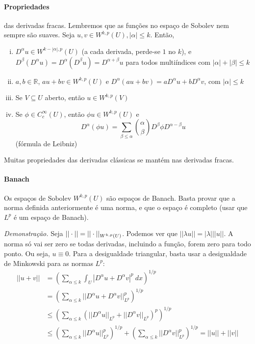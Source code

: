 \documentclass[11pt]{article}
\newcommand{\R}{\mathbb{R}}
\begin{document}
\paragraph{Propriedades} das derivadas fracas. Lembremos que as funções no espaço de Sobolev nem sempre são suaves. Seja \( u,v \in W^{k,p}(U), |\alpha| \leq k \). Então, \begin{enumerate}[(i)]
	\item \( D^\alpha u \in W^{k-|\alpha|, p}(U) \) (a cada derivada, perde-se \( 1 \) no \( k \)), e\\ \( D^\beta(D^\alpha u)=D^\alpha(D^\beta u) = D^{\alpha + \beta}u \) para todos multiíndices com \( |\alpha|+ |\beta| \leq k \)
	\item \(a, b \in \R \), \( au + bv \in W^{k,p}(U) \) e \( D^\alpha(au +bv) = aD^\alpha u + bD^\alpha v \), com \( |\alpha|\leq k \)
	\item Se \( V \subseteq U \) aberto, então \( u \in W^{k,p}(V) \)
	\item Se \( \phi \in C^\infty_c(U) \), então \( \phi u \in W^{k,p}(U) \) e \[ D^\alpha(\phi u) = \sum_{\beta \leq \alpha} \binom{\alpha}{\beta} D^\beta \phi D^{\alpha - \beta}u \] (fórmula de Leibniz)
\end{enumerate}

Muitas propriedades das derivadas clássicas se mantém nas derivadas fracas.

\paragraph{Banach} Os espaços de Sobolev \( W^{k,p}(U) \) são espaços de Banach. Basta provar que a norma definida anteriormente é uma norma, e que o espaço é completo (usar que \( L^p \) é um espaço de Banach).

\textit{Demonstração.} Seja \( || \cdot ||= ||\cdot ||_{W^{k,p}(U)} \). Podemos ver que \( ||\lambda u|| = |\lambda| ||u|| \). A norma só vai ser zero se todas derivadas, incluindo a função, forem zero para todo ponto. Ou seja, \( u \equiv 0 \). Para a desigualdade triangular, basta usar a desigualdade de Minkowski para as normas \( L^p \): \begin{align*}
	||u+v|| &= \left( \sum_{\alpha \leq k}\int_U | D^\alpha u + D^\alpha v |^p\ dx \right)^{1/p} \\
	&= \left( \sum_{\alpha \leq k} ||D^\alpha u+D^\alpha v||_{L^p}^p \right)^{1/p}\\
	&\leq  \left( \sum_{\alpha \leq k} (||D^\alpha u||_{L^p}+||D^\alpha v||_{L^p})^p \right)^{1/p}\\
	&\leq  \left( \sum_{\alpha \leq k} ||D^\alpha u||_{L^p}^p \right)^{1/p}+\left( \sum_{\alpha\leq k} ||D^\alpha v||_{L^p}^p \right)^{1/p} = ||u|| + ||v||
\end{align*}
\end{document}

